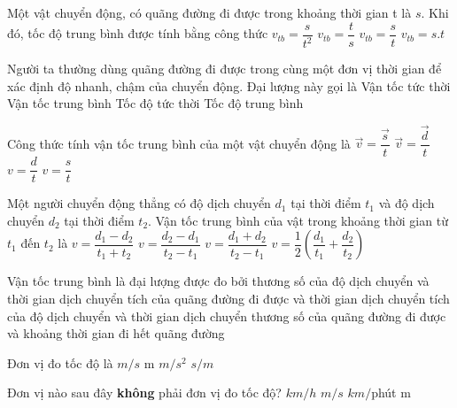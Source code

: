 \begin{ex}%
Một vật chuyển động, có quãng đường đi được trong khoảng thời gian t là $s$. Khi đó, tốc độ trung bình được tính bằng công thức
\choice
{$v_{t b}=\dfrac{s}{t^2}$}
{$v_{t b}=\dfrac{t}{s}$}
{\True $v_{t b}=\dfrac{s}{t}$}
{$v_{t b}=s. t$}

 \end{ex}
\begin{ex}%
Người ta thường dùng quãng đường đi được trong cùng một đơn vị thời gian để xác định độ nhanh, chậm của chuyển động. Đại lượng này gọi là
\choice
{Vận tốc tức thời}
{Vận tốc trung bình}
{Tốc độ tức thời}
{\True Tốc độ trung bình}

 \end{ex}
\begin{ex}%
Công thức tính vận tốc trung bình của một vật chuyển động là
\choice
{$\vec{v}=\dfrac{\vec{s}}{t}$}
{\True $\vec{v}=\dfrac{\vec{d}}{t}$}
{$v=\dfrac{d}{t}$}
{$v=\dfrac{s}{t}$}

\loigiai{

}
 \end{ex}
\begin{ex}%
Một người chuyển động thẳng có độ dịch chuyển $d_1$ tại thời điểm $t_1$ và độ dịch chuyển $d_2$ tại thời điểm $t_2$. Vận tốc trung bình của vật trong khoảng thời gian từ $t_1$ đến $t_2$ là
\choice
{$v=\dfrac{d_1-d_2}{t_1+t_2}$}
{\True $v=\dfrac{d_2-d_1}{t_2-t_1}$}
{$v=\dfrac{d_1+d_2}{t_2-t_1}$}
{$v=\dfrac{1}{2}\left(\dfrac{d_1}{t_1}+\dfrac{d_2}{t_2}\right)$}

 \end{ex}
\begin{ex}%
Vận tốc trung bình là đại lượng được đo bởi
\choice
{\True thương số của độ dịch chuyển và thời gian dịch chuyển}
{tích của quãng đường đi được và thời gian dịch chuyển}
{tích của độ dịch chuyển và thời gian dịch chuyển}
{thương số của quãng đường đi được và khoảng thời gian đi hết quãng đường}
\loigiai{

}
 \end{ex}
\begin{ex}%
Đơn vị đo tốc độ là
\choice
{\True $m/s$}
{m}
{$m/s^2$}
{$s / m$}

\loigiai{

}
 \end{ex}
\begin{ex}%
Đơn vị nào sau đây \textbf{không} phải đơn vị đo tốc độ?
\choice
{$km / h$}
{$m/s$}
{$km/$phút}
{\True m}

\loigiai{

}
 \end{ex}
